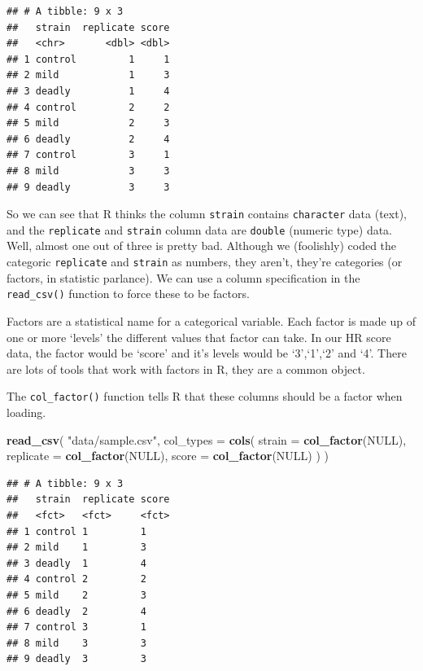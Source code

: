 \documentclass[
]{book}
\newenvironment{Shaded}{\begin{snugshade}}{\end{snugshade}}
\newcommand{\DataTypeTok}[1]{\textcolor[rgb]{0.13,0.29,0.53}{#1}}
\newcommand{\KeywordTok}[1]{\textcolor[rgb]{0.13,0.29,0.53}{\textbf{#1}}}
\newcommand{\NormalTok}[1]{#1}
\newcommand{\OtherTok}[1]{\textcolor[rgb]{0.56,0.35,0.01}{#1}}
\newcommand{\StringTok}[1]{\textcolor[rgb]{0.31,0.60,0.02}{#1}}
\newenvironment{sidenote}
{ \begin{tcolorbox}[colbacktitle=blue!50!white,
title=huh?,coltitle=white,
fonttitle=\bfseries] }
{  \end{tcolorbox} }
\begin{document}
\begin{verbatim}
## # A tibble: 9 x 3
##   strain  replicate score
##   <chr>       <dbl> <dbl>
## 1 control         1     1
## 2 mild            1     3
## 3 deadly          1     4
## 4 control         2     2
## 5 mild            2     3
## 6 deadly          2     4
## 7 control         3     1
## 8 mild            3     3
## 9 deadly          3     3
\end{verbatim}

So we can see that R thinks the column \texttt{strain} contains \texttt{character} data (text), and the \texttt{replicate} and \texttt{strain} column data are \texttt{double} (numeric type) data. Well, almost one out of three is pretty bad. Although we (foolishly) coded the categoric \texttt{replicate} and \texttt{strain} as numbers, they aren't, they're categories (or factors, in statistic parlance). We can use a column specification in the \texttt{read\_csv()} function to force these to be factors.

\begin{sidenote}
Factors are a statistical name for a categorical variable. Each factor is made up of one or more `levels' the different values that factor can take. In our HR score data, the factor would be `score' and it's levels would be `3',`1',`2' and `4'. There are lots of tools that work with factors in R, they are a common object.
\end{sidenote}

The \texttt{col\_factor()} function tells R that these columns should be a factor when loading.

\begin{Shaded}
\begin{Highlighting}[]
\KeywordTok{read_csv}\NormalTok{(}
  \StringTok{"data/sample.csv"}\NormalTok{,}
  \DataTypeTok{col_types =} \KeywordTok{cols}\NormalTok{(}
    \DataTypeTok{strain =} \KeywordTok{col_factor}\NormalTok{(}\OtherTok{NULL}\NormalTok{),}
    \DataTypeTok{replicate =} \KeywordTok{col_factor}\NormalTok{(}\OtherTok{NULL}\NormalTok{),}
    \DataTypeTok{score =} \KeywordTok{col_factor}\NormalTok{(}\OtherTok{NULL}\NormalTok{)}
\NormalTok{  )}
\NormalTok{)}
\end{Highlighting}
\end{Shaded}

\begin{verbatim}
## # A tibble: 9 x 3
##   strain  replicate score
##   <fct>   <fct>     <fct>
## 1 control 1         1    
## 2 mild    1         3    
## 3 deadly  1         4    
## 4 control 2         2    
## 5 mild    2         3    
## 6 deadly  2         4    
## 7 control 3         1    
## 8 mild    3         3    
## 9 deadly  3         3
\end{verbatim}
\end{document}

